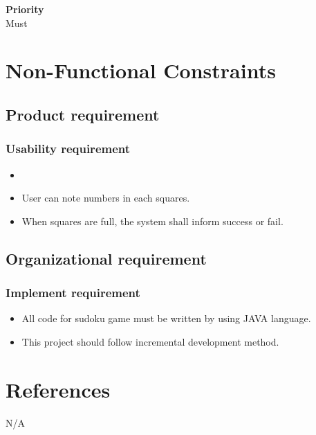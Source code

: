 \documentclass[12pt]{article}
\begin{document}
\noindent
{\bf Priority}\\
Must \\

\noindent

\section{Non-Functional Constraints}
\subsection{Product requirement}
\subsubsection{Usability requirement}
\begin{itemize}
\item 
\item User can note numbers in each squares.
\item When squares are full, the system shall inform success or fail.
\end{itemize}
\subsection{Organizational requirement}
\subsubsection{Implement requirement}
\begin{itemize}
\item All code for sudoku game must be written by using JAVA language.
\item This project should follow incremental development method.
\end{itemize}


\section{References}
N/A
\appendix %




\end{document}
